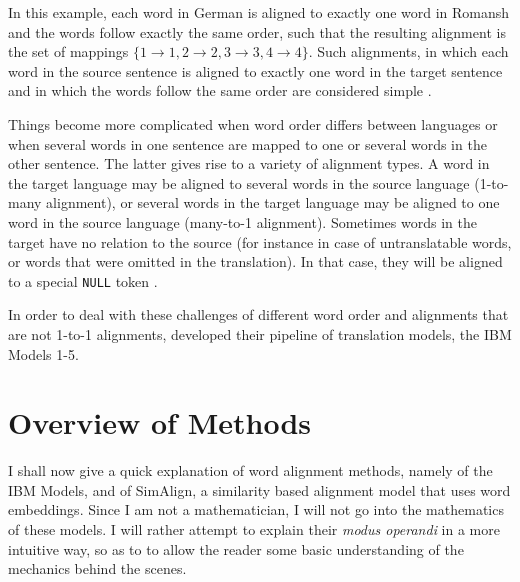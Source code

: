 In this example, each word in German is aligned to exactly one word in Romansh and the words follow exactly the same order, such that the resulting alignment is the set of mappings $\{1\to1, 2\to2,3\to3,4\to4\}$. 
Such alignments, in which each word in the source sentence is aligned to exactly one word in the target sentence and in which the words follow the same order are considered simple \autocite[85]{koehn2009}.

Things become more complicated when word order differs between languages or when several words in one sentence are mapped to one or several words in the other sentence. 
The latter gives rise to a variety of alignment types. 
A word in the target language may be aligned to several words in the source language (1-to-many alignment), or several words in the target language may be aligned to one word in the source language (many-to-1 alignment). 
Sometimes words in the target have no relation to the source (for instance in case of untranslatable words, or words that were omitted in the translation). 
In that case, they will be aligned to a special \texttt{NULL} token \autocite[85]{koehn2009}. 


In order to deal with these challenges of different word order and alignments that are not 1-to-1 alignments, \cite{brown-etal-1993-mathematics} developed their pipeline of translation models, the IBM Models 1-5.

\section{Overview of Methods}
I shall now give a quick explanation of word alignment methods, namely of the IBM Models, and of SimAlign, a similarity based alignment model that uses  word embeddings. 
Since I am not a mathematician, I will not go into the mathematics of these models. 
I will rather attempt to explain their \emph{modus operandi} in a more intuitive way, so as to to allow the reader some basic understanding of the mechanics behind the scenes.

